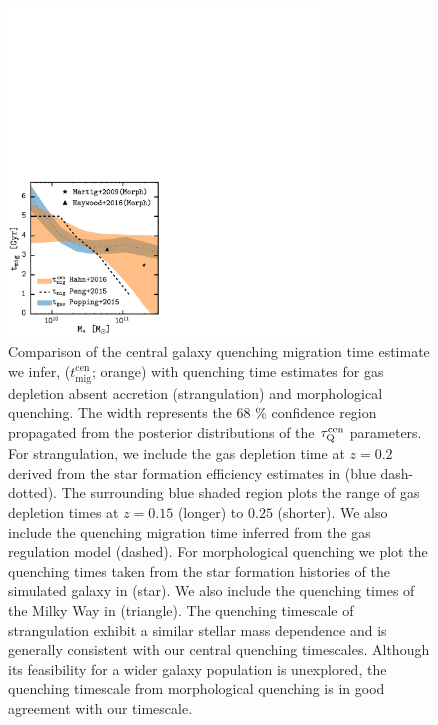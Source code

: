 \begin{figure}
\begin{center}
\includegraphics[width=0.75\textwidth]{figs/cenq/t_quenching_comparison_z0_2.pdf}
\caption{
Comparison of the central galaxy quenching migration time 
estimate we infer, ($t_\mathrm{mig}^\mathrm{cen}$; orange) with 
quenching time estimates for gas depletion absent accretion (strangulation)
and morphological quenching. The width represents the 68 \% 
confidence region propagated from the posterior distributions of the 
$\tau_\mathrm{Q}^\mathrm{cen}$ parameters. 
For strangulation, we include the gas depletion time at $z = 0.2$ derived 
from the star formation efficiency estimates in \cite{Popping:2015aa} 
(blue dash-dotted). The surrounding blue shaded region plots the range 
of gas depletion times at $z = 0.15$ (longer) to $0.25$ (shorter). 
We also include the quenching migration time inferred from 
the \cite{Peng:2015aa} gas regulation model (dashed). 
For morphological quenching we plot the quenching times taken from 
the star formation histories of the simulated galaxy in 
\cite{Martig:2009aa} (star). We also include the quenching times 
of the Milky Way in \cite{Haywood:2016aa} (triangle). 
The quenching timescale of strangulation exhibit a similar
stellar mass dependence and is generally consistent with our central 
quenching timescales. Although its feasibility 
for a wider galaxy population is unexplored, the quenching timescale
from morphological quenching is in good agreement with our timescale.}
\label{fig:tquench_comp}
\end{center}
\end{figure}

